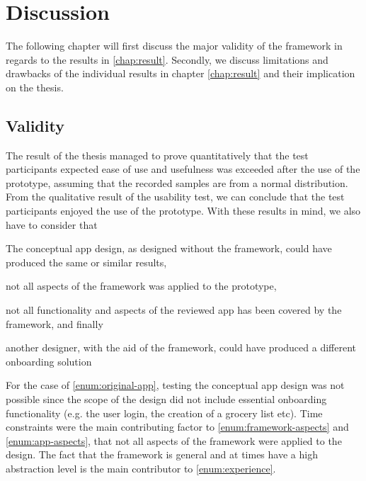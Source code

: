 \chapter{Discussion}
\label{chap:discussion}

The following chapter will first discuss the major validity of the framework in regards to the results in \ref{chap:result}. Secondly, we discuss limitations and drawbacks of the individual results in chapter \ref{chap:result} and their implication on the thesis.

\section{Validity}

The result of the thesis managed to prove quantitatively that the test participants expected ease of use and usefulness was exceeded after the use of the prototype, assuming that the recorded samples are from a normal distribution. From the qualitative result of the usability test, we can conclude that the test participants enjoyed the use of the prototype. With these results in mind, we also have to consider that
\begin{enumerate*}[label=(\(\arabic*\))]
  \item \label{enum:original-app}The conceptual app design, as designed without the framework, could have produced the same or similar results,
  \item \label{enum:framework-aspects}not all aspects of the framework was applied to the prototype,
  \item \label{enum:app-aspects}not all functionality and aspects of the reviewed app has been covered by the framework, and finally
  \item \label{enum:experience}another designer, with the aid of the framework, could have produced a different onboarding solution
\end{enumerate*}

For the case of \ref{enum:original-app},  testing the conceptual app design was not possible since the scope of the design did not include essential onboarding functionality (e.g. the user login, the creation of a grocery list etc). Time constraints were the main contributing factor to \ref{enum:framework-aspects} and \ref{enum:app-aspects}, that not all aspects of the framework were applied to the design. The fact that the framework is general and at times have a high abstraction level is the main contributor to \ref{enum:experience}.

